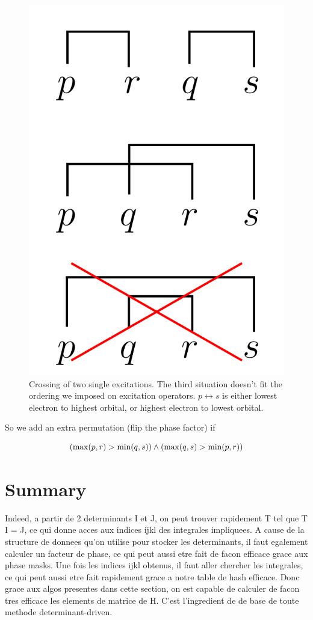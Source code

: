 \documentclass[./thesis.tex]{subfiles}
\begin{document}
\begin{figure}[h!]
	\begin{center}
		\includegraphics[width=0.2\columnwidth]{figures/determinant_driven/biphasefactor}
		\caption{
		\label{fig:biphasefactor}%
		Crossing of two single excitations.
		The third situation doesn't fit the ordering we imposed on excitation operators. $p \leftrightarrow s$ is either lowest electron to highest orbital, or highest electron to lowest orbital.
		}
	\end{center}
\end{figure}

So we add an extra permutation (flip the phase factor) if


\begin{equation}
 \qty( \max(p,r) > \min(q,s) ) \wedge \qty( \max(q,s) > \min(p,r) )
\end{equation}




\section{Summary}
\alert{
Indeed, a partir de 2 determinants I et J, on peut trouver rapidement T tel que T I = J, ce qui donne acces aux indices ijkl des integrales impliquees. A cause de la structure de donnees qu'on utilise pour stocker les determinants, il faut egalement calculer un facteur de phase, ce qui peut aussi etre fait de facon efficace grace aux phase masks. Une fois les indices ijkl obtenus, il faut aller chercher les integrales, ce qui peut aussi etre fait rapidement grace a notre table de hash efficace.
Donc grace aux algos presentes dans cette section, on est capable de calculer de facon tres efficace les elements de matrice de H. C'est l'ingredient de de base de toute methode determinant-driven.
}
\end{document}
